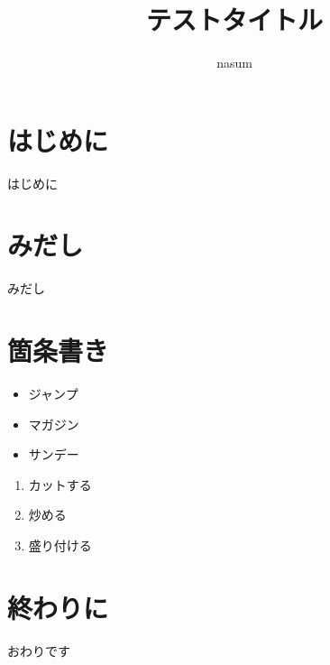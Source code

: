 \documentclass[dvipdfmx]{jsarticle}
\begin{document}
    \title{テストタイトル}
    \author{nasum}
    \maketitle

    \section{はじめに}
    はじめに
    \section{みだし}
    みだし
    \section{箇条書き}
    \begin{itemize}
        \item ジャンプ
        \item マガジン
        \item サンデー
    \end{itemize}

    \begin{enumerate}
        \item カットする
        \item 炒める
        \item 盛り付ける
    \end{enumerate}

    \section{終わりに}
    おわりです
\end{document}
